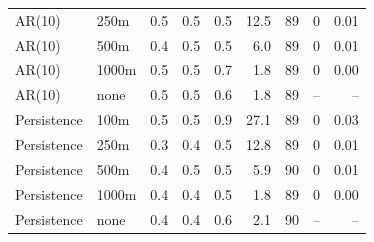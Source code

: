 \begin{tabular}{llrrrrrrr}
AR(10) & 250m & 0.5 & 0.5 & 0.5 & 12.5 & 89 & 0 & 0.01 \\
AR(10) & 500m & 0.4 & 0.5 & 0.5 & 6.0 & 89 & 0 & 0.01 \\
AR(10) & 1000m & 0.5 & 0.5 & 0.7 & 1.8 & 89 & 0 & 0.00 \\
AR(10) & none & 0.5 & 0.5 & 0.6 & 1.8 & 89 & -- & -- \\
Persistence & 100m & 0.5 & 0.5 & 0.9 & 27.1 & 89 & 0 & 0.03 \\
Persistence & 250m & 0.3 & 0.4 & 0.5 & 12.8 & 89 & 0 & 0.01 \\
Persistence & 500m & 0.4 & 0.5 & 0.5 & 5.9 & 90 & 0 & 0.01 \\
Persistence & 1000m & 0.4 & 0.4 & 0.5 & 1.8 & 89 & 0 & 0.00 \\
Persistence & none & 0.4 & 0.4 & 0.6 & 2.1 & 90 & -- & -- \\
\bottomrule
\end{tabular}
